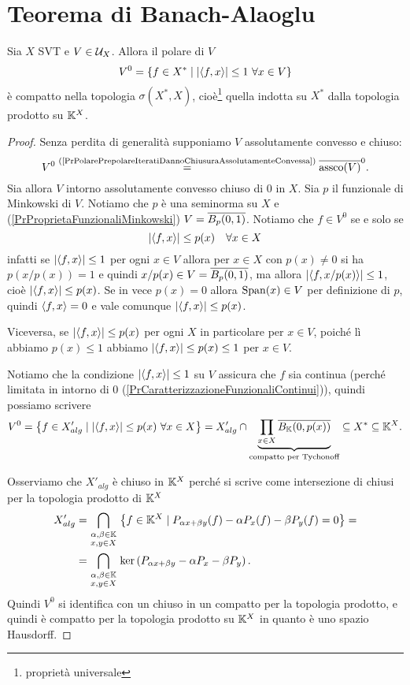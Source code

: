 \chapter{Teorema di Banach-Alaoglu}



\begin{theorem}\label{ThBanachAlaogluBourbaki}
Sia $X$ SVT e $V\in \Uc_X$. Allora il polare di $V$
\[V^0=\cpa{f\in X^\ast\mid \abs{\ps{f,x}}\leq 1\ \forall x\in V}\]
\`e compatto nella topologia $\sigma(X^\ast,X)$, cio\`e\footnote{propriet\`a universale} quella indotta su $X^\ast$ dalla topologia prodotto su $\K^X$.
\end{theorem}
\begin{proof}
Senza perdita di generalit\`a supponiamo $V$ assolutamente convesso e chiuso:
\[V^0\pasgnl={{(\ref{PrPolarePrepolareIteratiDannoChiusuraAssolutamenteConvessa})}}\ol{\assco(V)}^0.\]
Sia allora $V$ intorno assolutamente convesso chiuso di $0$ in $X$. Sia $p$ il funzionale di Minkowski di $V$. Notiamo che $p$ \`e una seminorma su $X$ e (\ref{PrProprietaFunzionaliMinkowski}) $V=\ol{B_p(0,1)}$. Notiamo che $f\in V^0$ se e solo se
\[\abs{\ps{f,x}}\leq p(x)\quad \forall x\in X\]
infatti se $\abs{\ps{f,x}}\leq 1$ per ogni $x\in V$ allora per $x\in X$ con $p(x)\neq 0$ si ha $p(x/p(x))=1$ e quindi $x/p(x)\in V=\ol{B_p(0,1)}$, ma allora $\abs{\ps{f,x/p(x)}}\leq 1$, cio\`e $\abs{\ps{f,x}}\leq p(x)$. Se in vece $p(x)=0$ allora $\Span(x)\in V$ per definizione di $p$, quindi $\ps{f,x}=0$ e vale comunque $\abs{\ps{f,x}}\leq p(x)$.

Viceversa, se $\abs{\ps{f,x}}\leq p(x)$ per ogni $X$ in particolare per $x\in V$, poich\'e l\`i abbiamo $p(x)\leq 1$ abbiamo $\abs{\ps{f,x}}\leq p(x)\leq 1$ per $x\in V$.

Notiamo che la condizione $\abs{\ps{f,x}}\leq 1$ su $V$ assicura che $f$ sia continua (perch\'e limitata in intorno di 0 (\ref{PrCaratterizzazioneFunzionaliContinui})), quindi possiamo scrivere
\[V^0=\cpa{f\in X'_{alg}\mid \abs{\ps{f,x}}\leq p(x)\ \forall x\in X}=X'_{alg}\cap\under{\text{compatto per Tychonoff}}{\prod_{x\in X}\ol{B_\K(0,p(x))}}\subseteq X^\ast\subseteq \K^X.\]

Osserviamo che $X'_{alg}$ \`e chiuso in $\K^X$ perch\'e si scrive come intersezione di chiusi per la topologia prodotto di $\K^X$
\begin{align*}
    X'_{alg}=&\bigcap_{\smat{\al,\beta\in\K\\x,y\in X}}\cpa{f\in\K^X\mid P_{\al x+\beta y}(f)-\al P_x(f)-\beta P_y(f)=0}=\\
    =&\bigcap_{\smat{\al,\beta\in\K\\x,y\in X}}\ker\pa{P_{\al x+\beta y}-\al P_x-\beta P_y}.
\end{align*}
Quindi $V^0$ si identifica con un chiuso in un compatto per la topologia prodotto, e quindi \`e compatto per la topologia prodotto su $\K^X$ in quanto \`e uno spazio Hausdorff.
\end{proof}


